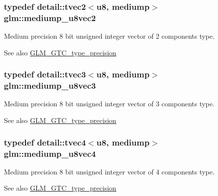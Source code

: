 \subsubsection[{\texorpdfstring{mediump\+\_\+u8vec2}{mediump_u8vec2}}]{\setlength{\rightskip}{0pt plus 5cm}typedef detail\+::tvec2$<$u8, mediump$>$ {\bf glm\+::mediump\+\_\+u8vec2}}\hypertarget{group__gtc__type__precision_ga5e20c1315bc1fecc867bc74525bea2ab}{}\label{group__gtc__type__precision_ga5e20c1315bc1fecc867bc74525bea2ab}
Medium precision 8 bit unsigned integer vector of 2 components type. \begin{DoxySeeAlso}{See also}
\hyperlink{group__gtc__type__precision}{G\+L\+M\+\_\+\+G\+T\+C\+\_\+type\+\_\+precision} 
\end{DoxySeeAlso}
\subsubsection[{\texorpdfstring{mediump\+\_\+u8vec3}{mediump_u8vec3}}]{\setlength{\rightskip}{0pt plus 5cm}typedef detail\+::tvec3$<$u8, mediump$>$ {\bf glm\+::mediump\+\_\+u8vec3}}\hypertarget{group__gtc__type__precision_ga58f79eee840b2838443292c50ddb2919}{}\label{group__gtc__type__precision_ga58f79eee840b2838443292c50ddb2919}
Medium precision 8 bit unsigned integer vector of 3 components type. \begin{DoxySeeAlso}{See also}
\hyperlink{group__gtc__type__precision}{G\+L\+M\+\_\+\+G\+T\+C\+\_\+type\+\_\+precision} 
\end{DoxySeeAlso}
\subsubsection[{\texorpdfstring{mediump\+\_\+u8vec4}{mediump_u8vec4}}]{\setlength{\rightskip}{0pt plus 5cm}typedef detail\+::tvec4$<$u8, mediump$>$ {\bf glm\+::mediump\+\_\+u8vec4}}\hypertarget{group__gtc__type__precision_ga407b5aa9a3fd6d344b70fa6ce2ce92d4}{}\label{group__gtc__type__precision_ga407b5aa9a3fd6d344b70fa6ce2ce92d4}
Medium precision 8 bit unsigned integer vector of 4 components type. \begin{DoxySeeAlso}{See also}
\hyperlink{group__gtc__type__precision}{G\+L\+M\+\_\+\+G\+T\+C\+\_\+type\+\_\+precision} 
\end{DoxySeeAlso}
